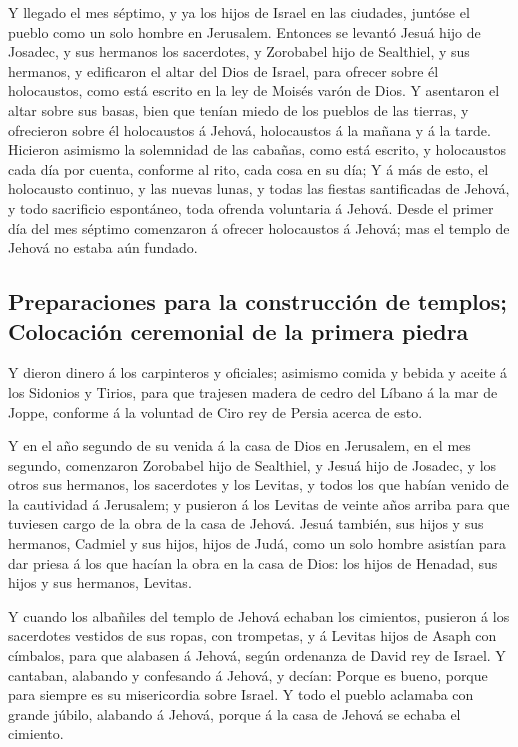  Y llegado el mes séptimo, y ya los hijos de Israel en las
ciudades, juntóse el pueblo como un solo hombre en Jerusalem.
 Entonces se levantó Jesuá hijo de Josadec, y sus hermanos
los sacerdotes, y Zorobabel hijo de Sealthiel, y sus hermanos, y
edificaron el altar del Dios de Israel, para ofrecer sobre él
holocaustos, como está escrito en la ley de Moisés varón de Dios.
 Y asentaron el altar sobre sus basas, bien que tenían
miedo de los pueblos de las tierras, y ofrecieron sobre él holocaustos á
Jehová, holocaustos á la mañana y á la tarde.  Hicieron
asimismo la solemnidad de las cabañas, como está escrito, y holocaustos
cada día por cuenta, conforme al rito, cada cosa en su día;
 Y á más de esto, el holocausto continuo, y las nuevas
lunas, y todas las fiestas santificadas de Jehová, y todo sacrificio
espontáneo, toda ofrenda voluntaria á Jehová.  Desde el
primer día del mes séptimo comenzaron á ofrecer holocaustos á Jehová;
mas el templo de Jehová no estaba aún fundado.

\hypertarget{preparaciones-para-la-construcciuxf3n-de-templos-colocaciuxf3n-ceremonial-de-la-primera-piedra}{%
\subsection{Preparaciones para la construcción de templos; Colocación
ceremonial de la primera
piedra}\label{preparaciones-para-la-construcciuxf3n-de-templos-colocaciuxf3n-ceremonial-de-la-primera-piedra}}

 Y dieron dinero á los carpinteros y oficiales; asimismo
comida y bebida y aceite á los Sidonios y Tirios, para que trajesen
madera de cedro del Líbano á la mar de Joppe, conforme á la voluntad de
Ciro rey de Persia acerca de esto.

 Y en el año segundo de su venida á la casa de Dios en
Jerusalem, en el mes segundo, comenzaron Zorobabel hijo de Sealthiel, y
Jesuá hijo de Josadec, y los otros sus hermanos, los sacerdotes y los
Levitas, y todos los que habían venido de la cautividad á Jerusalem; y
pusieron á los Levitas de veinte años arriba para que tuviesen cargo de
la obra de la casa de Jehová.  Jesuá también, sus hijos y
sus hermanos, Cadmiel y sus hijos, hijos de Judá, como un solo hombre
asistían para dar priesa á los que hacían la obra en la casa de Dios:
los hijos de Henadad, sus hijos y sus hermanos, Levitas.

 Y cuando los albañiles del templo de Jehová echaban los
cimientos, pusieron á los sacerdotes vestidos de sus ropas, con
trompetas, y á Levitas hijos de Asaph con címbalos, para que alabasen á
Jehová, según ordenanza de David rey de Israel.  Y
cantaban, alabando y confesando á Jehová, y decían: Porque es bueno,
porque para siempre es su misericordia sobre Israel. Y todo el pueblo
aclamaba con grande júbilo, alabando á Jehová, porque á la casa de
Jehová se echaba el cimiento.

